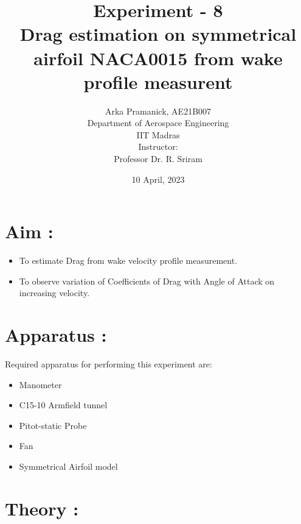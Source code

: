 \documentclass[12pt,a4paper]{article}
\title{{Experiment - 8\\ \textbf{Drag estimation on symmetrical airfoil NACA0015 from wake profile measurent}}}
\author{Arka Pramanick, AE21B007\\ Department of Aerospace Engineering\\ IIT Madras\\[3ex] Instructor:\\ \large Professor Dr. R. Sriram}
\date{10 April, 2023}
\begin{document}
\maketitle

\hline

\section{Aim :}
\begin{itemize}
    \item To estimate Drag from wake velocity profile measurement.
    \item To observe variation of Coefficients of Drag with Angle of Attack on increasing velocity.
\end{itemize}


\section{Apparatus :}
Required apparatus for performing this experiment are:
\begin{itemize}
    \item Manometer
    \item C15-10 Armfield tunnel
    \item Pitot-static Probe
    \item Fan
    \item Symmetrical Airfoil model
\end{itemize}



\newpage
\section{Theory :}
\end{document}
